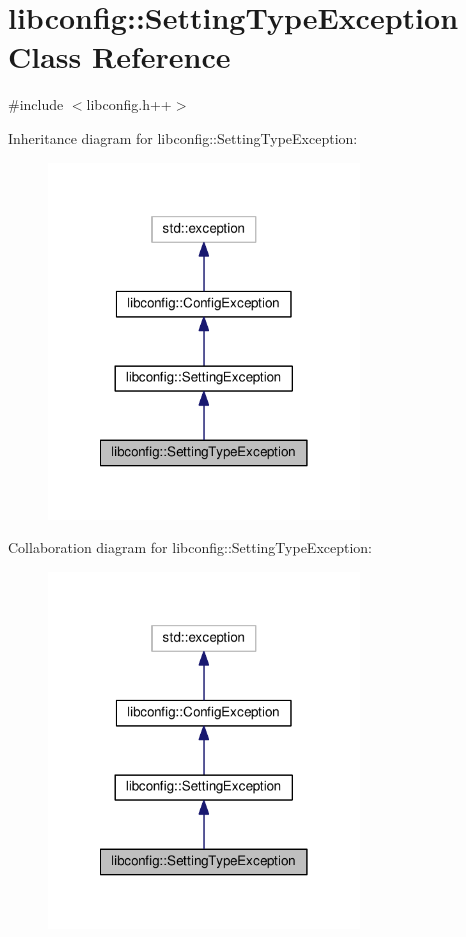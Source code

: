 \hypertarget{classlibconfig_1_1SettingTypeException}{\section{libconfig\-:\-:Setting\-Type\-Exception Class Reference}
\label{classlibconfig_1_1SettingTypeException}
}


{\ttfamily \#include $<$libconfig.\-h++$>$}



Inheritance diagram for libconfig\-:\-:Setting\-Type\-Exception\-:\nopagebreak
\begin{figure}[H]
\begin{center}
\leavevmode
\includegraphics[width=234pt]{classlibconfig_1_1SettingTypeException__inherit__graph}
\end{center}
\end{figure}


Collaboration diagram for libconfig\-:\-:Setting\-Type\-Exception\-:\nopagebreak
\begin{figure}[H]
\begin{center}
\leavevmode
\includegraphics[width=234pt]{classlibconfig_1_1SettingTypeException__coll__graph}
\end{center}
\end{figure}
